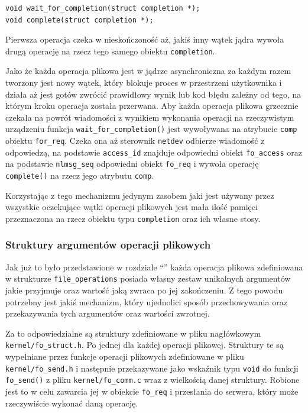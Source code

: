 \documentclass[11pt]{scrartcl}
\begin{document}
\begin{verbatim}
void wait_for_completion(struct completion *);
void complete(struct completion *);
\end{verbatim}

Pierwsza operacja czeka w nieskończoność aż, jakiś inny wątek jądra wywoła drugą operację na rzecz tego samego obiektu \texttt{completion}.

Jako że każda operacja plikowa jest w jądrze asynchroniczna za każdym razem tworzony jest nowy wątek, który blokuje proces w przestrzeni użytkownika i działa aż jest gotów zwrócić prawidłowy wynik lub kod błędu zależny od tego, na którym kroku operacja została przerwana. Aby każda operacja plikowa grzecznie czekała na powrót wiadomości z wynikiem wykonania operacji na rzeczywistym urządzeniu funkcja \texttt{wait\_for\_completion()} jest wywoływana na atrybucie \texttt{comp} obiektu \texttt{for\_req}. Czeka ona aż sterownik \texttt{netdev} odbierze wiadomość z odpowiedzą, na podstawie \texttt{access\_id} znajduje odpowiedni obiekt \texttt{fo\_access} oraz na podstawie \texttt{nlmsg\_seq} odpowiedni obiekt \texttt{fo\_req} i wywoła operację \texttt{complete()} na rzecz jego atrybutu \texttt{comp}.

Korzystając z tego mechanizmu jedynym zasobem jaki jest używany przez wszystkie oczekujące wątki operacji plikowych jest mała ilość pamięci przeznaczona na rzecz obiektu typu \texttt{completion} oraz ich własne stosy.

\subsubsection{Struktury argumentów operacji plikowych}

Jak już to było przedstawione w rozdziale ``'' każda operacja plikowa zdefiniowana w strukturze \texttt{file\_operations} posiada własny zestaw unikalnych argumentów jakie przyjmuje oraz wartość jaką zwraca po jej zakończeniu. Z tego powodu potrzebny jest jakiś mechanizm, który ujednolici sposób przechowywania oraz przekazywania tych argumentów oraz wartości zwrotnej.

Za to odpowiedzialne są struktury zdefiniowane w pliku nagłówkowym \texttt{kernel/fo\_struct.h}. Po jednej dla każdej operacji plikowej.  Struktury te są wypełniane przez funkcje operacji plikowych zdefiniowane w pliku \texttt{kernel/fo\_send.h} i następnie przekazywane jako wskaźnik typu \texttt{void} do funkcji \texttt{fo\_send()} z pliku \texttt{kernel/fo\_comm.c} wraz z wielkością danej struktury. Robione jest to w celu zawarcia jej w obiekcie \texttt{fo\_req} i przesłania do serwera, który może rzeczywiście wykonać daną operację.
\end{document}
